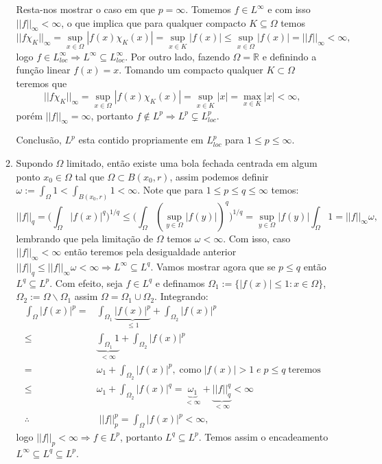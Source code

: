 \documentclass{article}
\begin{document}
\begin{enumerate}
\begin{enumerate}
			Resta-nos mostrar o caso em que $p=\infty$. Tomemos $f \in L^{\infty}$ e com isso $||f||_{\infty} < \infty$, o que implica que para qualquer compacto $K \subseteq \Omega$ temos 
			$$
			||f\chi_{K}||_{\infty} = \sup_{x \in \Omega}|f(x)\chi_{K} (x)|= \sup_{x \in K}|f(x)| \leq \sup_{x \in \Omega}|f(x)| = ||f||_{\infty} < \infty,
			$$
			logo $f \in L^{\infty}_{loc} \Rightarrow L^{\infty} \subseteq L^{\infty}_{loc}$. Por outro lado, fazendo $\Omega = \mathbb{R}$ e definindo a função linear $f(x) = x$. Tomando um compacto qualquer $K \subset \Omega$ teremos que 
			$$
			||f \chi_{K}||_{\infty} = \sup_{x \in \Omega}|f(x)\chi_{K} (x)| = \sup_{x \in K}|x| = \max_{x \in K}|x| < \infty,
			$$
			porém $||f||_{\infty} = \infty$, portanto $f \notin L^{p} \Rightarrow L^{p} \subsetneq L^{p}_{loc}$.
			
			Conclusão, $L^{p}$ esta contido propriamente em $L^{p}_{loc}$ para $1 \leq p \leq \infty$.
			
			\item Supondo $\Omega$ limitado, então existe uma bola fechada centrada em algum ponto $x_{0} \in \Omega$ tal que $\Omega \subset B(x_{0}, r)$, assim podemos definir $\omega := \int_{\Omega} 1 < \int_{B(x_0, r)} 1 < \infty$. Note que para $1 \leq p \leq q \leq \infty$ temos:
			$$
			||f||_{q} = \Big( \int_{\Omega} |f(x)|^{q} \Big)^{1/q} \leq \Big( \int_{\Omega} (\sup_{y \in \Omega}|f(y)|)^{q} \Big)^{1/q} = \sup_{y \in \Omega}|f(y)|\int_{\Omega} 1 = ||f||_{\infty}\omega,
			$$
			lembrando que pela limitação de $\Omega$ temos $\omega < \infty$. Com isso, caso $||f||_{\infty} < \infty$ então teremos pela desigualdade anterior $||f||_{q} \leq ||f||_{\infty}\omega < \infty \Rightarrow L^{\infty} \subseteq L^{q}$. Vamos mostrar agora que se $p \leq q$ então $L^{q} \subseteq L^{p}$. Com efeito, seja $f \in L^{q}$ e definamos $\Omega_{1} := \{ |f(x)| \leq 1: x \in \Omega \}$,  $\Omega_{2} := \Omega\backslash\Omega_{1}$ assim $\Omega = \Omega_{1} \cup \Omega_{2}$. Integrando:
			$$
			\begin{aligned}
			\int_{\Omega}|f(x)|^{p}
			= & \int_{\Omega_{1}} \underbrace{|f(x)|^{p}}_{\leq 1} + \int_{\Omega_{2}}|f(x)|^{p} \\
			\leq & \underbrace{ \int_{\Omega_{1}} 1 }_{< \infty}  + \int_{\Omega_{2}}|f(x)|^{p} \\
			= & \omega_{1} + \int_{\Omega_{2}} |f(x)|^{p}, \; \text{como} \; |f(x)|>1 \; e \; p\leq q \; \text{teremos}\\ 
			\leq & \omega_{1} + \int_{\Omega_{2}}|f(x)|^{q} = \underbrace{ \omega_{1} }_{< \infty }+ \underbrace{ ||f||_{q}^{q} }_{< \infty} < \infty \\
			\therefore & \; ||f||_{p}^{p} = \int_{\Omega}|f(x)|^{p} < \infty,
			\end{aligned}
			$$
			logo $||f||_{p} <\infty \Rightarrow f \in L^{p}$, portanto $L^{q} \subseteq L^{p}$. Temos assim o encadeamento $L^{\infty} \subseteq L^{q} \subseteq L^{p}$. 
			

\end{enumerate}
\end{enumerate}
\end{document}

